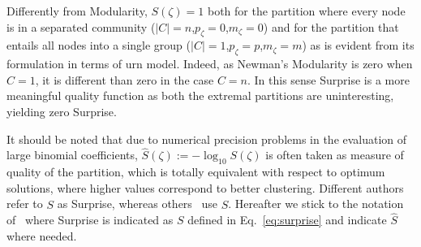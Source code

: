Differently from Modularity, $S(\zeta)=1$ both for the partition where every node is in a separated community ($|C|=n$,$p_\zeta=0$,$m_\zeta=0$) and for the partition that entails all nodes into a single group ($|C|=1$,$p_\zeta=p$,$m_\zeta=m$) as is evident from its formulation in terms of urn model. Indeed, as Newman's Modularity is zero when $C=1$, it is different than zero in the case $C=n$. In this sense Surprise is a more meaningful quality function as both the extremal partitions are uninteresting, yielding zero Surprise.

It should be noted that due to numerical precision problems in the evaluation of large binomial coefficients, $\hat{S}(\zeta) := -\log_{10}S(\zeta)$ is often taken as measure of quality of the partition, which is totally equivalent with respect to optimum solutions, where higher values correspond to better clustering.
Different authors~\cite{arnauVMarsS2005,fleck2014} refer to $S$ as Surprise, whereas others~\cite{aldecoa2011,aldecoa2013} use $\hat{S}$. Hereafter we stick to the notation of~\cite{fleck2014} where Surprise is indicated as $S$ defined in Eq.~\ref{eq:surprise} and indicate $\hat{S}$ where needed.

